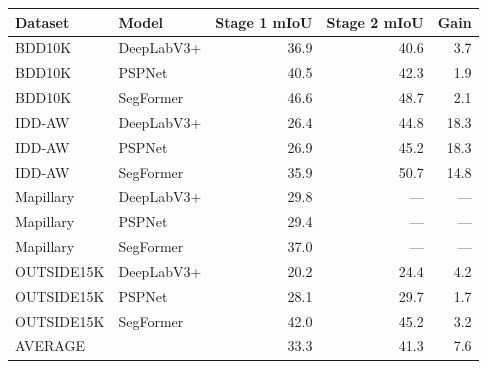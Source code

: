 \begin{tabular}{llrrr}
\toprule
Dataset & Model & Stage 1 mIoU & Stage 2 mIoU & Gain \\
\midrule
BDD10K & DeepLabV3+ & 36.9 & 40.6 & 3.7 \\
BDD10K & PSPNet & 40.5 & 42.3 & 1.9 \\
BDD10K & SegFormer & 46.6 & 48.7 & 2.1 \\
IDD-AW & DeepLabV3+ & 26.4 & 44.8 & 18.3 \\
IDD-AW & PSPNet & 26.9 & 45.2 & 18.3 \\
IDD-AW & SegFormer & 35.9 & 50.7 & 14.8 \\
Mapillary & DeepLabV3+ & 29.8 & — & — \\
Mapillary & PSPNet & 29.4 & — & — \\
Mapillary & SegFormer & 37.0 & — & — \\
OUTSIDE15K & DeepLabV3+ & 20.2 & 24.4 & 4.2 \\
OUTSIDE15K & PSPNet & 28.1 & 29.7 & 1.7 \\
OUTSIDE15K & SegFormer & 42.0 & 45.2 & 3.2 \\
AVERAGE &  & 33.3 & 41.3 & 7.6 \\
\bottomrule
\end{tabular}

